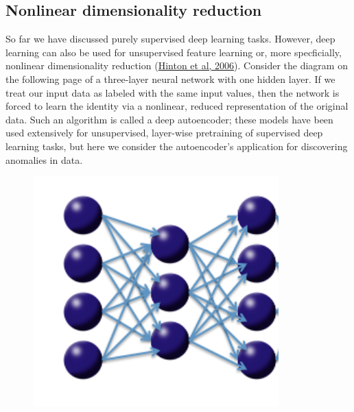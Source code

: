 \documentclass[11pt]{article}
\begin{document}
\subsection{Nonlinear dimensionality reduction} \label{4.1}
So far we have discussed purely supervised deep learning tasks. However, deep learning can also be used for unsupervised feature learning or, more specficially, nonlinear dimensionality reduction  (\href{http://www.cs.toronto.edu/~hinton/science.pdf}{Hinton et al, 2006}). Consider the diagram on the following page of a three-layer neural network with one hidden layer. If we treat our input data as labeled with the same input values, then the network is forced to learn the identity via a nonlinear, reduced representation of the original data. Such an algorithm is called a deep autoencoder; these models have been used extensively for unsupervised, layer-wise pretraining of supervised deep learning tasks, but here we consider the autoencoder's application for discovering anomalies in data. 
\\
\begin{figure}[h!]
\centering
\includegraphics[scale=0.7]{autoencoder.png}
\end{figure}
\end{document}
